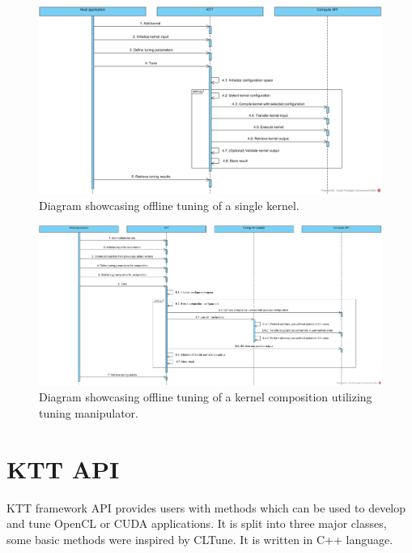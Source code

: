 \documentclass
[
    digital, %
    oneside, %
    table, %
    nolof, %
    nolot, %
    nocover %
]{fithesis3}
\begin{document}
\clearpage
\thispagestyle{plain}
\begin{figure}
    \begin{adjustwidth}{-3.5cm}{-3.5cm}
        \includegraphics[width=250mm]{resources/ktt_sequence_diagram_single.jpg}
    \end{adjustwidth}
    \caption{Diagram showcasing offline tuning of a single kernel.}
    \label{ktt-sequence-diagram-single}
\end{figure}
\clearpage

\clearpage
\thispagestyle{plain}
\begin{figure}
    \begin{adjustwidth}{-3.5cm}{-3.5cm}
        \includegraphics[width=250mm]{resources/ktt_sequence_diagram_composite.jpg}
    \end{adjustwidth}
    \caption{Diagram showcasing offline tuning of a kernel composition utilizing tuning manipulator.}
    \label{ktt-sequence-diagram-composite}
\end{figure}
\clearpage

\section{KTT API}
KTT framework API provides users with methods which can be used to develop and tune OpenCL or CUDA applications. It is split into three major
classes, some basic methods were inspired by CLTune. It is written in C++ language.
\end{document}

